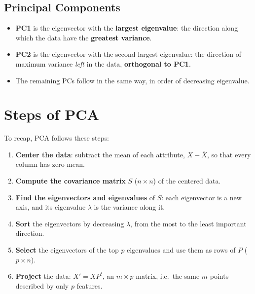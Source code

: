 \begin{center}
\end{center}

\subsection{Principal Components}
\begin{itemize}
    \item \textbf{PC1} is the eigenvector with the \textbf{largest eigenvalue}: the direction along which the data have the \textbf{greatest variance}.
    \item \textbf{PC2} is the eigenvector with the second largest eigenvalue: the direction of maximum variance \emph{left} in the data, \textbf{orthogonal to PC1}.
    \item The remaining PCs follow in the same way, in order of decreasing eigenvalue.
\end{itemize}

\section{Steps of PCA}
To recap, PCA follows these steps:

\begin{enumerate}
    \item \textbf{Center the data}: subtract the mean of each attribute, $X - \overline{X}$, so that every column has zero mean.
    \item \textbf{Compute the covariance matrix} $S$ ($n \times n$) of the centered data.
    \item \textbf{Find the eigenvectors and eigenvalues} of $S$: each eigenvector is a new axis, and its eigenvalue $\lambda$ is the variance along it.
    \item \textbf{Sort} the eigenvectors by decreasing $\lambda$, from the most to the least important direction.
    \item \textbf{Select} the eigenvectors of the top $p$ eigenvalues and use them as rows of $P$ ($p \times n$).
    \item \textbf{Project} the data: $X' = XP^t$, an $m \times p$ matrix, i.e.\ the same $m$ points described by only $p$ features.
\end{enumerate}

